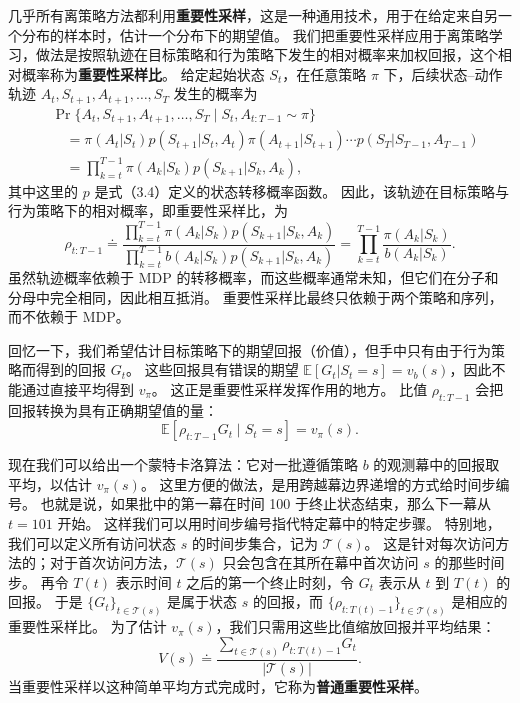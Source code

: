 \documentclass[UTF8, 12pt, fontset=fandol, oneside]{ctexart}
\begin{document}
几乎所有离策略方法都利用\textbf{重要性采样}，这是一种通用技术，用于在给定来自另一个分布的样本时，估计一个分布下的期望值。
我们把重要性采样应用于离策略学习，做法是按照轨迹在目标策略和行为策略下发生的相对概率来加权回报，这个相对概率称为\textbf{重要性采样比}。
给定起始状态 $S_t$，在任意策略 $\pi$ 下，后续状态--动作轨迹 $A_t,S_{t+1},A_{t+1},\ldots,S_T$ 发生的概率为
\[
\begin{aligned}
&\Pr\{A_t,S_{t+1},A_{t+1},\ldots,S_T\mid S_t,A_{t:T-1}\sim\pi\}\\
&\quad = \pi(A_t|S_t)p(S_{t+1}|S_t,A_t)\pi(A_{t+1}|S_{t+1})\cdots p(S_T|S_{T-1},A_{T-1})\\
&\quad = \prod_{k=t}^{T-1}\pi(A_k|S_k)p(S_{k+1}|S_k,A_k),
\end{aligned}
\]
其中这里的 $p$ 是式（3.4）定义的状态转移概率函数。
因此，该轨迹在目标策略与行为策略下的相对概率，即重要性采样比，为
\begin{equation}
\rho_{t:T-1}\doteq
\frac{\prod_{k=t}^{T-1}\pi(A_k|S_k)p(S_{k+1}|S_k,A_k)}
{\prod_{k=t}^{T-1}b(A_k|S_k)p(S_{k+1}|S_k,A_k)}
=\prod_{k=t}^{T-1}\frac{\pi(A_k|S_k)}{b(A_k|S_k)}.
\end{equation}
虽然轨迹概率依赖于 MDP 的转移概率，而这些概率通常未知，但它们在分子和分母中完全相同，因此相互抵消。
重要性采样比最终只依赖于两个策略和序列，而不依赖于 MDP。

回忆一下，我们希望估计目标策略下的期望回报（价值），但手中只有由于行为策略而得到的回报 $G_t$。
这些回报具有错误的期望 $\mathbb{E}[G_t|S_t=s]=v_b(s)$，因此不能通过直接平均得到 $v_\pi$。
这正是重要性采样发挥作用的地方。
比值 $\rho_{t:T-1}$ 会把回报转换为具有正确期望值的量：
\begin{equation}
\mathbb{E}[\rho_{t:T-1}G_t\mid S_t=s]=v_\pi(s).
\end{equation}

现在我们可以给出一个蒙特卡洛算法：它对一批遵循策略 $b$ 的观测幕中的回报取平均，以估计 $v_\pi(s)$。
这里方便的做法，是用跨越幕边界递增的方式给时间步编号。
也就是说，如果批中的第一幕在时间 100 于终止状态结束，那么下一幕从 $t=101$ 开始。
这样我们可以用时间步编号指代特定幕中的特定步骤。
特别地，我们可以定义所有访问状态 $s$ 的时间步集合，记为 $\mathcal{T}(s)$。
这是针对每次访问方法的；对于首次访问方法，$\mathcal{T}(s)$ 只会包含在其所在幕中首次访问 $s$ 的那些时间步。
再令 $T(t)$ 表示时间 $t$ 之后的第一个终止时刻，令 $G_t$ 表示从 $t$ 到 $T(t)$ 的回报。
于是 $\{G_t\}_{t\in\mathcal{T}(s)}$ 是属于状态 $s$ 的回报，而 $\{\rho_{t:T(t)-1}\}_{t\in\mathcal{T}(s)}$ 是相应的重要性采样比。
为了估计 $v_\pi(s)$，我们只需用这些比值缩放回报并平均结果：
\begin{equation}
V(s)\doteq
\frac{\sum_{t\in\mathcal{T}(s)}\rho_{t:T(t)-1}G_t}{|\mathcal{T}(s)|}.
\end{equation}
当重要性采样以这种简单平均方式完成时，它称为\textbf{普通重要性采样}。
\end{document}
